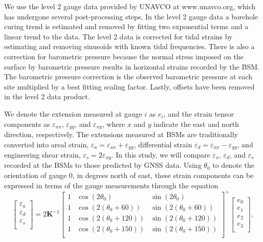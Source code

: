 \documentclass[10pt,a4paper]{article}
\begin{document}
We use the level 2 gauge data provided by UNAVCO at www.unavco.org, which has undergone several post-processing steps. In the level 2 gauge data a borehole curing trend is estimated and removed by fitting two exponential terms and a linear trend to the data. The level 2 data is corrected for tidal strains by estimating and removing sinusoids with known tidal frequencies. There is also a correction for barometric pressure because the normal stress imposed on the surface by barometric pressure results in horizontal strains recorded by the BSM. The barometric pressure correction is the observed barometric pressure at each site multiplied by a best fitting scaling factor. Lastly, offsets have been removed in the level 2 data product.    

We denote the extension measured at gauge $i$ as $e_i$, and the strain tensor components as $\varepsilon_{xx}$, $\varepsilon_{yy}$, and $\varepsilon_{xy}$, where $x$ and $y$ indicate the east and north direction, respectively. The extensions measured at BSMs are traditionally converted into areal strain, $\varepsilon_a = \varepsilon_{xx} + \varepsilon_{yy}$, differential strain $\varepsilon_d = \varepsilon_{xx} - \varepsilon_{yy}$, and engineering shear strain, $\varepsilon_s = 2\varepsilon_{xy}$. In this study, we will compare $\varepsilon_a$, $\varepsilon_d$, and $\varepsilon_s$ recorded at the BSMs to those predicted by GNSS data. Using $\theta_0$ to denote the orientation of gauge 0, in degrees north of east, these strain components can be expressed in terms of the gauge measurements through the equation 
\begin{equation}\label{eq:GaugeToStrain}
\left[\begin{array}{c}
\varepsilon_a \\
\varepsilon_d \\
\varepsilon_s \\
\end{array}\right]
=
2\mathbf{K}^{-1}\left[\begin{array}{ccc}
1 & \cos(2\theta_0) & \sin(2\theta_0) \\
1 & \cos(2(\theta_0 + 60)) & \sin(2(\theta_0 + 60)) \\
1 & \cos(2(\theta_0 + 120)) & \sin(2(\theta_0 + 120)) \\
1 & \cos(2(\theta_0 + 150)) & \sin(2(\theta_0 + 150)) \\
\end{array}\right]^+
\left[\begin{array}{c}
e_0 \\
e_1 \\
e_2 \\
e_3 \\
\end{array}\right],
\end{equation} 
\end{document}

